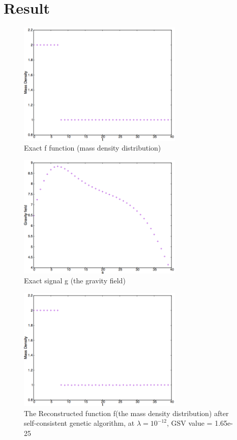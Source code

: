 \documentclass{article}
\begin{document}
\section{Result}
\begin{figure}[h!]
  \centering
    \includegraphics[width=0.7\textwidth]{images/exactmassdensity}
  \caption{Exact f function (mass density distribution)}
  \label{fig:MASS}
\end{figure}
\begin{figure}[h!]
  \centering
    \includegraphics[width=0.7\textwidth]{images/exactgravityfield}
  \caption{Exact signal g (the gravity field)}
  \label{fig:G}
\end{figure}
\begin{figure}[h!]
  \centering
    \includegraphics[width=0.7\textwidth]{images/reconstructedmassdensitygood}
  \caption{The Reconstructed function f(the mass density distribution) after
  self-consistent genetic algorithm, at \(\lambda  = {10^{ - 12}}\), GSV value
  = 1.65e-25}
  \label{fig:RMASSGOOD}
\end{figure}
\end{document}
